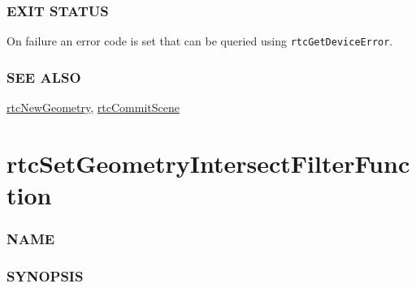\subsubsection{EXIT STATUS}\label{exit-status}

On failure an error code is set that can be queried using
\texttt{rtcGetDeviceError}.

\subsubsection{SEE ALSO}\label{see-also}

\hyperref[rtcnewgeometry]{rtcNewGeometry},
\hyperref[rtccommitscene]{rtcCommitScene}

\pagebreak

\section{rtcSetGeometryIntersectFilterFunction}\label{rtcsetgeometryintersectfilterfunction}

\subsubsection{NAME}\label{name}

\begin{Shaded}
\begin{Highlighting}[]
\OperatorTok{{-}}
\end{Highlighting}
\end{Shaded}

\subsubsection{SYNOPSIS}\label{synopsis}

